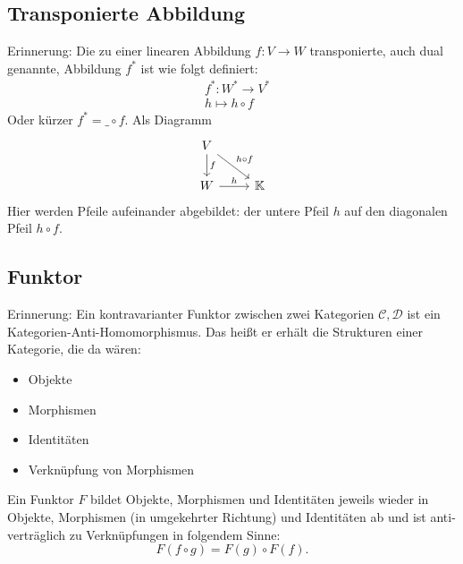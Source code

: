 \documentclass[a4paper]{amsart}
\theoremstyle{definition}
\newcommand{\K}{\ensuremath{\mathbb{ K }}}
\begin{document}
\subsection{Transponierte Abbildung}
Erinnerung: Die zu einer linearen Abbildung $f \colon V \to W$ transponierte, auch dual genannte, Abbildung $f^*$ ist wie folgt definiert:
\begin{align}
   &f^* \colon W^* \to V^* \\
   &h \mapsto h\circ f
\end{align}
Oder kürzer $f^* = \_ \circ f$. Als Diagramm
\begin{equation}
   \begin{tikzcd}
      V \arrow[rd, "h \circ f"] \arrow[d, "f"] \\
      W \arrow[r, "h"] & \K
   \end{tikzcd}
\end{equation}
Hier werden Pfeile aufeinander abgebildet: der untere Pfeil $h$ auf den diagonalen Pfeil $h \circ f$.

\subsection{Funktor}
Erinnerung: Ein kontravarianter Funktor zwischen zwei Kategorien $\mathcal{C, D}$ ist ein Kategorien-Anti-Homomorphismus. Das heißt er erhält die Strukturen einer Kategorie, die da wären:
\begin{itemize}
	\item Objekte
	\item Morphismen
	\item Identitäten
	\item Verknüpfung von Morphismen
\end{itemize} 
Ein Funktor $F$ bildet Objekte, Morphismen und Identitäten jeweils wieder in Objekte, Morphismen (in umgekehrter Richtung) und Identitäten ab und ist anti-verträglich zu Verknüpfungen in folgendem Sinne:
\begin{equation}
	F( f \circ g ) = F( g ) \circ F(  f ).
\end{equation}
\end{document}
